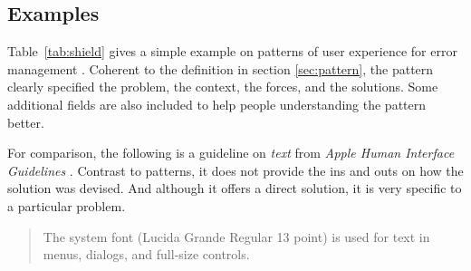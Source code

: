 \documentclass{acm_proc_article-sp}
\begin{document}
\subsection{Examples}
Table~\ref{tab:shield} gives a simple example on patterns of user
experience for error management \citep{patterns:welie}. Coherent to
the definition in section \ref{sec:pattern}, the pattern clearly
specified the problem, the context, the forces, and the
solutions. Some additional fields are also included to help people
understanding the pattern better.

For comparison, the following is a guideline on \textit{text} from
\textit{Apple Human Interface Guidelines} \citep{hig:apple}. Contrast
to patterns, it does not provide the ins and outs on how the solution
was devised. And although it offers a direct solution, it is very
specific to a particular problem.
\begin{quote}
The system font (Lucida Grande Regular 13 point) is used for text in
menus, dialogs, and full-size controls.
\end{quote}
\end{document}
